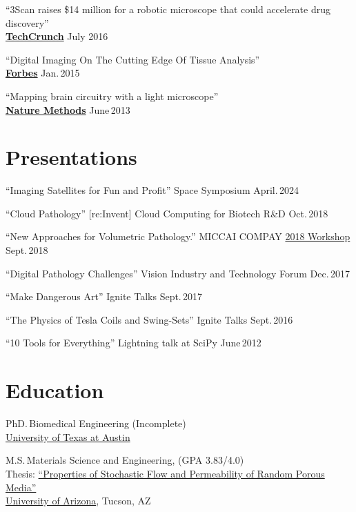 \documentclass{res}
\begin{document}
\begin{resume}
  ``3Scan raises \$14 million for a robotic microscope that could accelerate drug discovery'' \\
  \href{https://techcrunch.com/2016/07/11/3scan-raises-14-million-for-a-robotic-microscope-that-could-accelerate-drug-discovery/
  }{\textbf{TechCrunch}} \hfill July 2016
  
  ``Digital Imaging On The Cutting Edge Of Tissue Analysis'' \\
  \href{https://www.forbes.com/sites/joshwolfe/2015/01/28/digital-imaging-on-the-cutting-edge-of-tissue-analysis/}{\textbf{Forbes}} \hfill Jan.\,2015
  
  ``Mapping brain circuitry with a light microscope'' \\
  \href{https://www.ncbi.nlm.nih.gov/pmc/articles/PMC3982327/}{\textbf{Nature Methods}} \hfill June\,2013
  
\section{Presentations}
  ``Imaging Satellites for Fun and Profit''
  Space Symposium \hfill April.\,2024

  ``Cloud Pathology''
  [re:Invent] Cloud Computing for Biotech R\&D \hfill Oct.\,2018

  ``New Approaches for Volumetric Pathology.''
  MICCAI COMPAY \href{https://sites.google.com/site/compaysymposium2018/speakers}{2018 Workshop} \hfill Sept.\,2018

  ``Digital Pathology Challenges''
  Vision Industry and Technology Forum \hfill Dec.\,2017

  ``Make Dangerous Art''
  Ignite Talks \hfill Sept.\,2017

  ``The Physics of Tesla Coils and Swing-Sets''
  Ignite Talks \hfill Sept.\,2016

  ``10 Tools for Everything''
  Lightning talk at SciPy \hfill June\,2012

\section{Education}
  PhD.\,Biomedical Engineering (Incomplete) \\
  \href{https://www.bme.utexas.edu/}{University of Texas at Austin}
  
  M.S.\,Materials Science and Engineering,
  (GPA 3.83/4.0) \\
  Thesis: \href{http://hdl.handle.net/10150/193422}{``Properties of Stochastic Flow and Permeability of Random Porous Media''} \\
  \href{https://mse.engineering.arizona.edu/}{University of Arizona}, Tucson, AZ
  

\end{resume}
\end{document}
